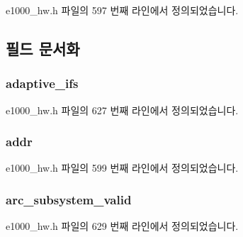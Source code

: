 e1000\+\_\+hw.\+h 파일의 597 번째 라인에서 정의되었습니다.



\subsection{필드 문서화}
\subsubsection[{\texorpdfstring{adaptive\+\_\+ifs}{adaptive_ifs}}]{ adaptive\+\_\+ifs}\hypertarget{structe1000__mac__info_ac130342e3a13fe1ce3e014bd55d11836}{}\label{structe1000__mac__info_ac130342e3a13fe1ce3e014bd55d11836}


e1000\+\_\+hw.\+h 파일의 627 번째 라인에서 정의되었습니다.

\subsubsection[{\texorpdfstring{addr}{addr}}]{ addr}\hypertarget{structe1000__mac__info_afee13f7d77f1101ef9c6c76654220344}{}\label{structe1000__mac__info_afee13f7d77f1101ef9c6c76654220344}


e1000\+\_\+hw.\+h 파일의 599 번째 라인에서 정의되었습니다.

\subsubsection[{\texorpdfstring{arc\+\_\+subsystem\+\_\+valid}{arc_subsystem_valid}}]{ arc\+\_\+subsystem\+\_\+valid}\hypertarget{structe1000__mac__info_accbb8e3943e55029a810bd38b616a8f0}{}\label{structe1000__mac__info_accbb8e3943e55029a810bd38b616a8f0}


e1000\+\_\+hw.\+h 파일의 629 번째 라인에서 정의되었습니다.

